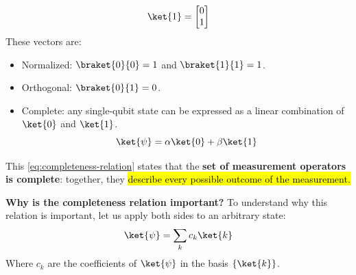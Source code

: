 \begin{deepeningbox}
\begin{examplebox}
\begin{equation*}
            \ket{1} =
            \begin{bmatrix}
                0 \\
                1
            \end{bmatrix}
        \end{equation*}
        These vectors are:
        \begin{itemize}
            \item Normalized: $\braket{0}{0} = 1$ and $\braket{1}{1} = 1$.
            \item Orthogonal: $\braket{0}{1} = 0$.
            \item Complete: any single-qubit state can be expressed as a linear combination of $\ket{0}$ and $\ket{1}$.
            \begin{equation*}
                \ket{\psi} = \alpha \ket{0} + \beta \ket{1}
            \end{equation*}
        \end{itemize}
    \end{examplebox}
\end{deepeningbox}

\noindent
This \autoref{eq:completeness-relation} states that the \textbf{set of measurement operators is complete}: together, they \hl{describe every possible outcome of the measurement.}

\highspace
\textcolor{Green3}{ \textbf{Why is the completeness relation important?}}
To understand why this relation is important, let us apply both sides to an arbitrary state:
\begin{equation*}
    \ket{\psi}
    =
    \sum_k c_k \ket{k}
\end{equation*}
Where $c_k$ are the coefficients of $\ket{\psi}$ in the basis $\{\ket{k}\}$.

